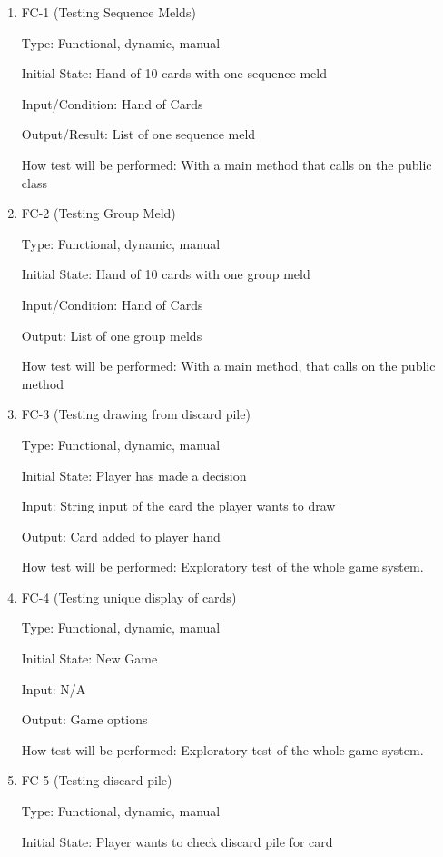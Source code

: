 \documentclass[12pt, titlepage]{article}
\begin{document}
\begin{enumerate}

\item{FC-1 (Testing Sequence Melds)}

Type: Functional, dynamic, manual
					
Initial State: Hand of 10 cards with one sequence meld
					
Input/Condition: Hand of Cards
					
Output/Result: List of one sequence meld
					
How test will be performed: With a main method that calls on the public class
					
\item{FC-2 (Testing Group Meld)}

Type: Functional, dynamic, manual
					
Initial State: Hand of 10 cards with one group meld
					
Input/Condition: Hand of Cards
					
Output: List of one group melds
					
How test will be performed: With a main method, that calls on the public method

\item{FC-3 (Testing drawing from discard pile)}

Type: Functional, dynamic, manual
					
Initial State: Player has made a decision
					
Input: String input of the card the player wants to draw
					
Output: Card added to player hand
					
How test will be performed: Exploratory test of the whole game system.

\item{FC-4 (Testing unique display of cards)}

Type: Functional, dynamic, manual
					
Initial State: New Game
					
Input: N/A
					
Output: Game options
					
How test will be performed: Exploratory test of the whole game system.

\item{FC-5 (Testing discard pile)}

Type: Functional, dynamic, manual
					
Initial State: Player wants to check discard pile for card
					

\end{enumerate}
\end{document}
